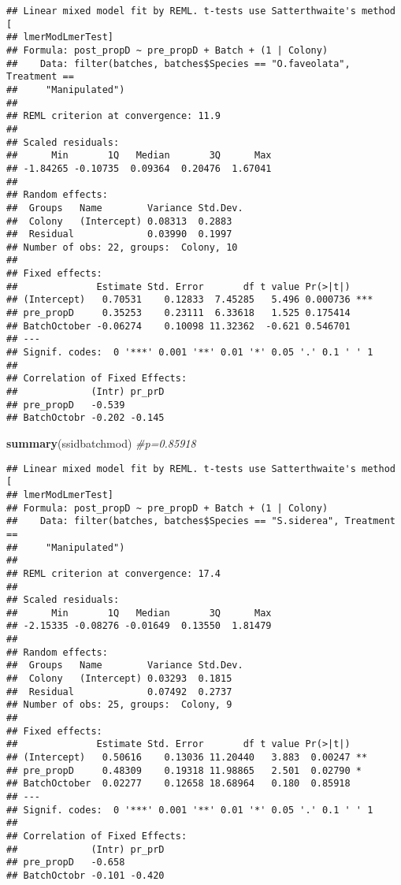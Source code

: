\documentclass[]{article}
\newenvironment{Shaded}{\begin{snugshade}}{\end{snugshade}}
\newcommand{\CommentTok}[1]{\textcolor[rgb]{0.56,0.35,0.01}{\textit{#1}}}
\newcommand{\KeywordTok}[1]{\textcolor[rgb]{0.13,0.29,0.53}{\textbf{#1}}}
\newcommand{\NormalTok}[1]{#1}
\begin{document}
\begin{verbatim}
## Linear mixed model fit by REML. t-tests use Satterthwaite's method [
## lmerModLmerTest]
## Formula: post_propD ~ pre_propD + Batch + (1 | Colony)
##    Data: filter(batches, batches$Species == "O.faveolata", Treatment ==  
##     "Manipulated")
## 
## REML criterion at convergence: 11.9
## 
## Scaled residuals: 
##      Min       1Q   Median       3Q      Max 
## -1.84265 -0.10735  0.09364  0.20476  1.67041 
## 
## Random effects:
##  Groups   Name        Variance Std.Dev.
##  Colony   (Intercept) 0.08313  0.2883  
##  Residual             0.03990  0.1997  
## Number of obs: 22, groups:  Colony, 10
## 
## Fixed effects:
##              Estimate Std. Error       df t value Pr(>|t|)    
## (Intercept)   0.70531    0.12833  7.45285   5.496 0.000736 ***
## pre_propD     0.35253    0.23111  6.33618   1.525 0.175414    
## BatchOctober -0.06274    0.10098 11.32362  -0.621 0.546701    
## ---
## Signif. codes:  0 '***' 0.001 '**' 0.01 '*' 0.05 '.' 0.1 ' ' 1
## 
## Correlation of Fixed Effects:
##             (Intr) pr_prD
## pre_propD   -0.539       
## BatchOctobr -0.202 -0.145
\end{verbatim}

\begin{Shaded}
\begin{Highlighting}[]
\KeywordTok{summary}\NormalTok{(ssidbatchmod) }\CommentTok{#p=0.85918}
\end{Highlighting}
\end{Shaded}

\begin{verbatim}
## Linear mixed model fit by REML. t-tests use Satterthwaite's method [
## lmerModLmerTest]
## Formula: post_propD ~ pre_propD + Batch + (1 | Colony)
##    Data: filter(batches, batches$Species == "S.siderea", Treatment ==  
##     "Manipulated")
## 
## REML criterion at convergence: 17.4
## 
## Scaled residuals: 
##      Min       1Q   Median       3Q      Max 
## -2.15335 -0.08276 -0.01649  0.13550  1.81479 
## 
## Random effects:
##  Groups   Name        Variance Std.Dev.
##  Colony   (Intercept) 0.03293  0.1815  
##  Residual             0.07492  0.2737  
## Number of obs: 25, groups:  Colony, 9
## 
## Fixed effects:
##              Estimate Std. Error       df t value Pr(>|t|)   
## (Intercept)   0.50616    0.13036 11.20440   3.883  0.00247 **
## pre_propD     0.48309    0.19318 11.98865   2.501  0.02790 * 
## BatchOctober  0.02277    0.12658 18.68964   0.180  0.85918   
## ---
## Signif. codes:  0 '***' 0.001 '**' 0.01 '*' 0.05 '.' 0.1 ' ' 1
## 
## Correlation of Fixed Effects:
##             (Intr) pr_prD
## pre_propD   -0.658       
## BatchOctobr -0.101 -0.420
\end{verbatim}
\end{document}
